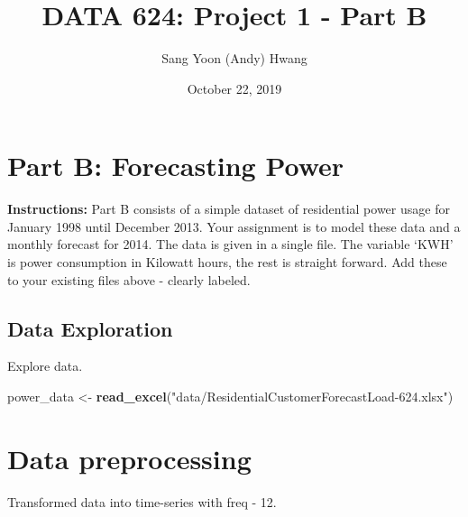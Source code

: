 \documentclass[openany]{book}
\title{DATA 624: Project 1 - Part B}
\author{Sang Yoon (Andy) Hwang}
\date{October 22, 2019}
\newenvironment{Shaded}{\begin{snugshade}}{\end{snugshade}}
\newcommand{\DataTypeTok}[1]{\textcolor[rgb]{0.13,0.29,0.53}{#1}}
\newcommand{\DecValTok}[1]{\textcolor[rgb]{0.00,0.00,0.81}{#1}}
\newcommand{\KeywordTok}[1]{\textcolor[rgb]{0.13,0.29,0.53}{\textbf{#1}}}
\newcommand{\NormalTok}[1]{#1}
\newcommand{\OperatorTok}[1]{\textcolor[rgb]{0.81,0.36,0.00}{\textbf{#1}}}
\newcommand{\StringTok}[1]{\textcolor[rgb]{0.31,0.60,0.02}{#1}}
\renewenvironment{quote}{\begin{myquote}}{\end{myquote}}
\begin{document}
\maketitle

{
\setcounter{tocdepth}{1}
\tableofcontents
}
\hypertarget{part-b-forecasting-power}{%
\chapter{Part B: Forecasting Power}\label{part-b-forecasting-power}}

\begin{quote}
\textbf{Instructions:} Part B consists of a simple dataset of
residential power usage for January 1998 until December 2013. Your
assignment is to model these data and a monthly forecast for 2014. The
data is given in a single file. The variable `KWH' is power consumption
in Kilowatt hours, the rest is straight forward. Add these to your
existing files above - clearly labeled.
\end{quote}

\hypertarget{data-exploration}{%
\section{Data Exploration}\label{data-exploration}}

Explore data.

\begin{Shaded}
\begin{Highlighting}[]
\NormalTok{power_data <-}\StringTok{ }\KeywordTok{read_excel}\NormalTok{(}\StringTok{"data/ResidentialCustomerForecastLoad-624.xlsx"}\NormalTok{) }
\end{Highlighting}
\end{Shaded}

\hypertarget{data-preprocessing}{%
\chapter{Data preprocessing}\label{data-preprocessing}}

Transformed data into time-series with freq - 12.

\begin{Shaded}
\end{Shaded}
\end{document}
